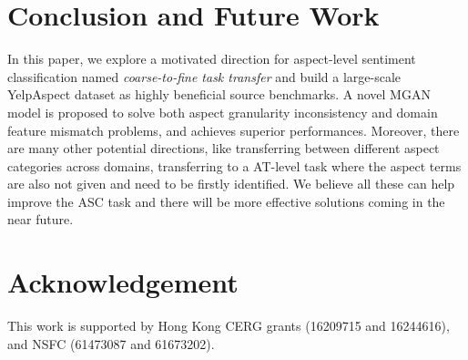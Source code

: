 \documentclass[letterpaper]{article} \usepackage{aaai19}  \usepackage{times}  \usepackage{latexsym}
\begin{document}
\section{Conclusion and Future Work}
\vspace{-0.5mm}
In this paper, we explore a motivated direction for aspect-level sentiment classification named {\it coarse-to-fine task transfer} and build a large-scale YelpAspect dataset as highly beneficial source benchmarks. A novel MGAN model is proposed to solve both aspect granularity inconsistency and domain feature mismatch problems, and achieves superior performances. Moreover, there are many other potential directions, like transferring between different aspect categories across domains, transferring to a AT-level task where the aspect terms are also not given and need to be firstly identified. We believe all these can help improve the ASC task and there will be more effective solutions coming in the near future.

\section{Acknowledgement}
This work is supported by Hong Kong CERG grants (16209715 and 16244616), and NSFC (61473087 and 61673202).

\small


\end{document}
